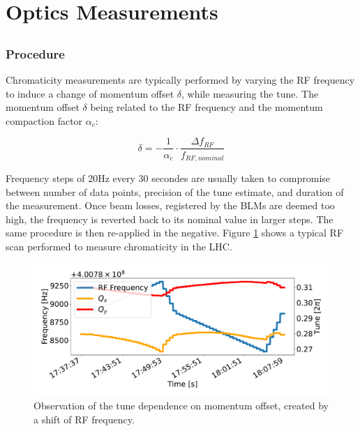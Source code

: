 \section{Optics Measurements}



\subsection{}





\subsection{}

\subsubsection{Procedure}

Chromaticity measurements are typically performed by varying the RF frequency to induce a change of
momentum offset $\delta$, while measuring the tune.  The momentum offset $\delta$ being related to
the RF frequency and the momentum compaction factor $\alpha_c$:

\begin{equation}
    \delta = - \frac{1}{\alpha_c} \cdot \frac{\Delta f_{RF}}{f_{RF,nominal}}
    \label{eq:dpp_rf}
\end{equation}

Frequency steps of 20Hz every 30 secondes are usually taken to compromise between number of data
points, precision of the tune estimate, and duration of the measurement. Once beam losses,
registered by the BLMs are deemed too high, the frequency is reverted back to its nominal value in
larger steps. The same procedure is then re-applied in the negative. Figure
\ref{fig:measurements:rf_scan} shows a typical RF scan performed to measure chromaticity in the LHC.

\begin{figure}[H]
    \centering
    \includegraphics[width=1\textwidth]{images/rf_scan.pdf}
    \caption{Observation of the tune dependence on momentum offset, created by a shift of RF
             frequency.}
    \label{fig:measurements:rf_scan}
\end{figure}




